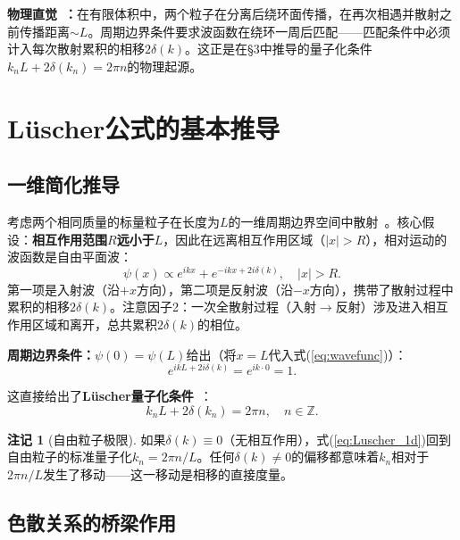 \documentclass[12pt,a4paper]{ctexart}
\theoremstyle{definition}
\newtheorem{remark}{注记}[section]
\begin{document}
\textbf{物理直觉~\cite{GattringerLang2010,dispersion2026}：}在有限体积中，两个粒子在分离后绕环面传播，在再次相遇并散射之前传播距离$\sim L$。周期边界条件要求波函数在绕环一周后匹配——匹配条件中必须计入每次散射累积的相移$2\delta(k)$。这正是在§3中推导的量子化条件$k_n L + 2\delta(k_n) = 2\pi n$的物理起源。

\section{L\"uscher公式的基本推导}

\subsection{一维简化推导}

考虑两个相同质量的标量粒子在长度为$L$的一维周期边界空间中散射~\cite{GattringerLang2010}。核心假设：\textbf{相互作用范围$R$远小于$L$}，因此在远离相互作用区域（$|x| > R$），相对运动的波函数是自由平面波：
\begin{equation}\label{eq:wavefunc}
    \psi(x) \propto e^{ikx} + e^{-ikx + 2i\delta(k)}, \quad |x| > R.
\end{equation}
第一项是入射波（沿$+x$方向），第二项是反射波（沿$-x$方向），携带了散射过程中累积的相移$2\delta(k)$。注意因子2：一次全散射过程（入射$\to$反射）涉及进入相互作用区域和离开，总共累积$2\delta(k)$的相位。

\textbf{周期边界条件：}$\psi(0) = \psi(L)$给出（将$x=L$代入式(\ref{eq:wavefunc})）：
\begin{equation}\label{eq:matching_1d}
    e^{ikL+2i\delta(k)} = e^{ik\cdot 0} = 1.
\end{equation}

这直接给出了\textbf{L\"uscher量子化条件}~\cite{GattringerLang2010}：
\begin{equation}\label{eq:Luscher_1d}
    \boxed{k_n L + 2\delta(k_n) = 2\pi n, \quad n \in \mathbb{Z}.}
\end{equation}

\begin{remark}[自由粒子极限]
如果$\delta(k) \equiv 0$（无相互作用），式(\ref{eq:Luscher_1d})回到自由粒子的标准量子化$k_n = 2\pi n/L$。任何$\delta(k) \neq 0$的偏移都意味着$k_n$相对于$2\pi n/L$发生了移动——这一移动是相移的直接度量。
\end{remark}

\subsection{色散关系的桥梁作用}
\end{document}
